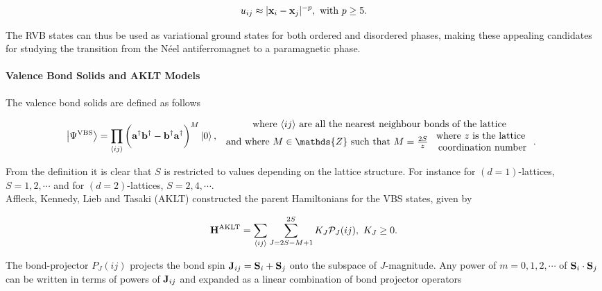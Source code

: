 $$
    u_{ij} \approx |{\bf x}_i - {\bf x}_j|^{-p}, \textnormal{ with } p \geq 5.
$$

The RVB states can thus be used as variational ground states for both ordered and disordered phases, making these appealing candidates for studying the transition from the Néel antiferromagnet to a paramagnetic phase. \\

\paragraph{Valence Bond Solids and AKLT Models}

The valence bond solids are defined as follows 

\begin{equation}
\ket{\Psi^{\textnormal{VBS}}} = \prod_{\langle ij \rangle} \bigg({\bf a}^\dagger {\bf b}^\dagger - {\bf b}^\dagger {\bf a}^\dagger\bigg)^M \ket{0}, \begin{array}{c}
     \textnormal{where $\langle ij \rangle$ are all the nearest neighbour bonds of the lattice} \\
     \textnormal{ and where $M \in \mathds{Z}$ such that } M  =\frac{2S}{z} \begin{array}{cc}
          \textnormal{ where $z$ is the lattice }  \\
          \textnormal{ coordination number}
     \end{array}.
     \label{valence_bond_solids}
\end{array}
\end{equation}

From the definition it is clear that $S$ is restricted to values depending on the lattice structure. For instance for $(d=1)$-lattices, $S = 1, 2, \cdots$ and for $(d=2)$-lattices, $S = 2,4, \cdots$. \\

Affleck, Kennedy, Lieb and Tasaki (AKLT) constructed the parent Hamiltonians for the VBS states, given by 

\begin{equation}
    {\bf H}^{\textnormal{AKLT}} = \sum_{\langle ij \rangle} \sum_{J = 2S-M+1}^{2S} K_J \mathcal{P}_{J}(ij), \textnormal{ } K_J \geq 0.
\end{equation}

The bond-projector $P_J(ij)$ projects the bond spin ${\bf J}_{ij} = {\bf S}_i + {\bf S}_j$ onto the subspace of $J$-magnitude. Any power of $m = 0, 1, 2, \cdots$ of ${\bf S}_i \cdot {\bf S}_j$ can be written in terms of powers of ${\bf J}_{ij}$ and expanded as a linear combination of bond projector operators 

